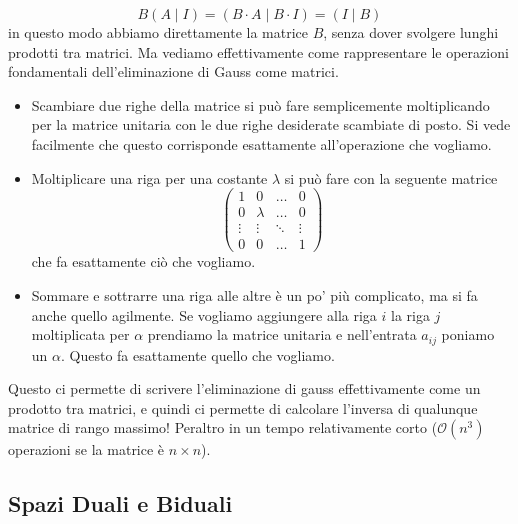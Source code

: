 \documentclass[11pt]{scrartcl}
\begin{document}
  	 $$B(A\mid I)=(B\cdot A\mid B\cdot I)=(I\mid B)$$
  	 in questo modo abbiamo direttamente la matrice $B$, senza dover svolgere lunghi prodotti tra matrici. Ma vediamo effettivamente come rappresentare le operazioni fondamentali dell'eliminazione di Gauss come matrici.
  	 \begin{itemize}
  	 	\item Scambiare due righe della matrice si può fare semplicemente moltiplicando per la matrice unitaria con le due righe desiderate scambiate di posto. Si vede facilmente che questo corrisponde esattamente all'operazione che vogliamo.
  	 	\item Moltiplicare una riga per una costante $\lambda$ si può fare con la seguente matrice
  	 	$$\begin{pmatrix}
  	 		1 & 0 & \dots & 0 \\
  	 		0 & \lambda & \dots & 0 \\
  	 		\vdots & \vdots & \ddots & \vdots \\
  	 		0 & 0 & \dots & 1
  	 	\end{pmatrix}$$
  	 	che fa esattamente ciò che vogliamo.
  	 	\item Sommare e sottrarre una riga alle altre è un po' più complicato, ma si fa anche quello agilmente. Se vogliamo aggiungere alla riga $i$ la riga $j$ moltiplicata per $\alpha$ prendiamo la matrice unitaria e nell'entrata $a_{ij}$ poniamo un $\alpha$. Questo fa esattamente quello che vogliamo.
  	 \end{itemize}
  	 Questo ci permette di scrivere l'eliminazione di gauss effettivamente come un prodotto tra matrici, e quindi ci permette di calcolare l'inversa di qualunque matrice di rango massimo! Peraltro in un tempo relativamente corto ($\mathcal{O}(n^3)$ operazioni se la matrice è $n\times n$). \\
  	 
  	 \subsection{Spazi Duali e Biduali}
  	 
\end{document}
